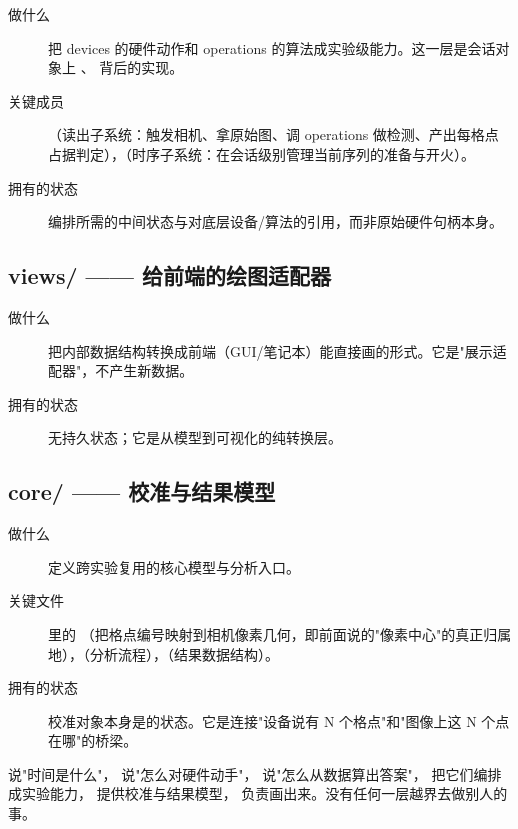 \documentclass[11pt,oneside,openany]{book}
\begin{document}
\begin{description}
\item[做什么] 把 devices 的硬件动作和 operations 的算法成实验级能力。这一层是会话对象上 、 背后的实现。
\item[关键成员] （读出子系统：触发相机、拿原始图、调 operations 做检测、产出每格点占据判定），（时序子系统：在会话级别管理当前序列的准备与开火）。
\item[拥有的状态] 编排所需的中间状态与对底层设备/算法的引用，而非原始硬件句柄本身。
\end{description}

\subsection{views/ —— 给前端的绘图适配器}

\begin{description}
\item[做什么] 把内部数据结构转换成前端（GUI/笔记本）能直接画的形式。它是"展示适配器"，不产生新数据。
\item[拥有的状态] 无持久状态；它是从模型到可视化的纯转换层。
\end{description}

\subsection{core/ —— 校准与结果模型}

\begin{description}
\item[做什么] 定义跨实验复用的核心模型与分析入口。
\item[关键文件]  里的 （把格点编号映射到相机像素几何，即前面说的"像素中心"的真正归属地），（分析流程），（结果数据结构）。
\item[拥有的状态] 校准对象本身是的状态。它是连接"设备说有 N 个格点"和"图像上这 N 个点在哪"的桥梁。
\end{description}

\begin{notebox}[一句话记住分层]
 说"时间是什么"， 说"怎么对硬件动手"， 说"怎么从数据算出答案"， 把它们编排成实验能力， 提供校准与结果模型， 负责画出来。没有任何一层越界去做别人的事。
\end{notebox}
\end{document}
